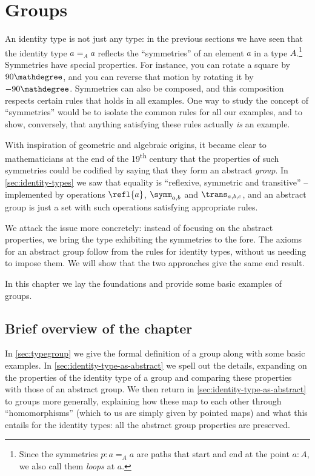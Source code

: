 \chapter{Groups}
\label{ch:groups}


An identity type is not just any type:  in the previous sections we have seen that the identity type $a=_Aa$ reflects the ``symmetries'' of an element $a$ in a type $A$.\footnote{%
  Since the symmetries $p : a=_A a$ are paths that start and end
  at the point $a:A$, we also call them \emph{loops} at $a$.\par
  }
Symmetries have special properties.  For instance, you can rotate a square by $90\mathdegree$, and you can reverse that motion by rotating it by $-90\mathdegree$.
Symmetries can also be composed, and this composition respects certain rules that holds in all examples.  One way to study the concept of ``symmetries'' would be to isolate the common rules for all our examples, and to show, conversely, that anything satisfying these rules actually \emph{is} an example.



With inspiration of geometric and algebraic origins, it became clear to mathematicians at the end of the 19\textsuperscript{th} century that the properties of such symmetries could be codified by saying that they form an abstract \emph{group}.
In \cref{sec:identity-types} we saw that equality is ``reflexive, symmetric and transitive'' -- implemented by operations $\refl{a}$, $\symm_{a,b}$ and $\trans_{a,b,c}$,
and an abstract group is just a set with such operations satisfying appropriate rules.

We attack the issue more concretely:
instead of focusing on the abstract properties,
we bring the type exhibiting the symmetries to the fore.
The axioms for an abstract group follow from the rules for identity types,
without us needing to impose them.
We will show that the two approaches give the same end result.

In this chapter we lay the foundations and provide some basic examples of groups.

\section{Brief overview of the chapter}
In \cref{sec:typegroup} we give the formal definition of a group along with some basic examples.
In \cref{sec:identity-type-as-abstract} we spell out the details, expanding on the properties of the identity type of a group and comparing these properties with those of an abstract group.  We then return in \cref {sec:identity-type-as-abstract} to groups more generally, explaining how these map to each other through ``homomorphisms'' (which to us are simply given by pointed maps) and what this entails for the identity types: all the abstract group properties are preserved.

